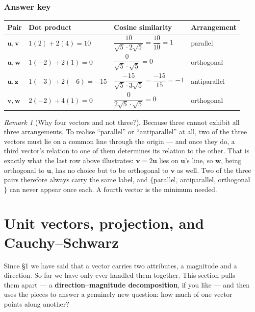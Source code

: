 \documentclass[11pt]{article}
\theoremstyle{definition}
\theoremstyle{remark}
\newtheorem*{rmk}{Remark}
\newcommand{\vc}[1]{\mathbf{#1}}
\begin{document}
\subsubsection*{Answer key}
\begin{center}
\renewcommand{\arraystretch}{2.1}   %
\begin{tabular}{@{}l l l l@{}}
\toprule
\textbf{Pair} & \textbf{Dot product} & \textbf{Cosine similarity} & \textbf{Arrangement} \\
\midrule
$\vc{u},\vc{v}$
  & $1(2)+2(4)=10$
  & $\dfrac{10}{\sqrt5\cdot 2\sqrt5}=\dfrac{10}{10}=1$
  & parallel \\
$\vc{u},\vc{w}$
  & $1(-2)+2(1)=0$
  & $\dfrac{0}{\sqrt5\cdot\sqrt5}=0$
  & orthogonal \\
$\vc{u},\vc{z}$
  & $1(-3)+2(-6)=-15$
  & $\dfrac{-15}{\sqrt5\cdot 3\sqrt5}=\dfrac{-15}{15}=-1$
  & antiparallel \\
\midrule
$\vc{v},\vc{w}$
  & $2(-2)+4(1)=0$
  & $\dfrac{0}{2\sqrt5\cdot\sqrt5}=0$
  & orthogonal \\
\bottomrule
\end{tabular}
\end{center}

\begin{rmk}[Why four vectors and not three?]
Because three cannot exhibit all three arrangements. To realise ``parallel'' or
``antiparallel'' at all, two of the three vectors must lie on a common line
through the origin --- and once they do, a third vector's relation to one of
them determines its relation to the other. That is exactly what the last row
above illustrates: $\vc{v}=2\vc{u}$ lies on $\vc{u}$'s line, so $\vc{w}$, being
orthogonal to $\vc{u}$, has no choice but to be orthogonal to $\vc{v}$ as well.
Two of the three pairs therefore always carry the same label, and
$\{$parallel, antiparallel, orthogonal$\}$ can never appear once each. A fourth
vector is the minimum needed.
\end{rmk}

\section{Unit vectors, projection, and Cauchy--Schwarz}
Since \S1 we have said that a vector carries two attributes, a magnitude and a
direction. So far we have only ever handled them together. This section pulls
them apart --- a \textbf{direction--magnitude decomposition}, if you like ---
and then uses the pieces to answer a genuinely new question: how much of one
vector points along another?
\end{document}
